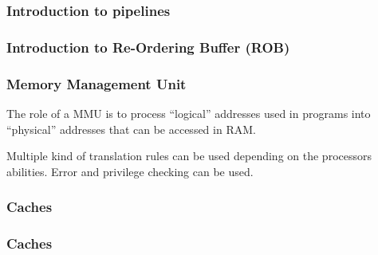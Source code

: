 
\begin{frame}
  \frametitle{Introduction to pipelines}

  \begin{center}
  \end{center}

\end{frame}


\begin{frame}
  \frametitle{Introduction to Re-Ordering Buffer (ROB)}

  \begin{center}
  \end{center}

\end{frame}


\begin{frame}
  \frametitle{Memory Management Unit}

  The role of a MMU is to process ``logical'' addresses used in
  programs into ``physical'' addresses that can be accessed in RAM.

  \-

  \begin{center}
  \end{center}

  Multiple kind of translation rules can be used depending on the
  processors abilities. Error and privilege checking can be used.

\end{frame}


\begin{frame}
  \frametitle{Caches}

  \begin{center}
  \end{center}

\end{frame}


\begin{frame}
  \frametitle{Caches}

  \begin{center}
  \end{center}

\end{frame}

